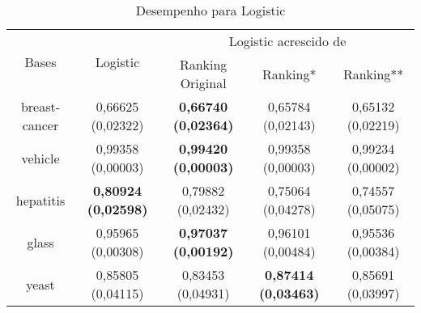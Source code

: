 \begin{table}[h]
    \begin{tabular}{ c c c c c }
        \hline

        \multirow{2}{*}{Bases} & \multirow{2}{*}{Logistic} & \multicolumn{3}{c}{Logistic acrescido de} \\ \cline{3-5}
        & & {\small Ranking Original} & {\small Ranking*} & {\small  Ranking**} \\
        
        \hline
        
        breast-cancer & {\small 0,66625 (0,02322)} & {\small \textbf{0,66740 (0,02364)}} & {\small 0,65784 (0,02143)} & {\small 0,65132 (0,02219)} \\
        vehicle & {\small 0,99358 (0,00003)} & {\small \textbf{0,99420 (0,00003)}} & {\small 0,99358 (0,00003)} & {\small 0,99234 (0,00002)} \\
        hepatitis & {\small \textbf{0,80924 (0,02598)}} & {\small 0,79882 (0,02432)} & {\small 0,75064 (0,04278)} & {\small 0,74557 (0,05075)} \\
        glass & {\small 0,95965 (0,00308)} & {\small \textbf{0,97037 (0,00192)}} & {\small 0,96101 (0,00484)} & {\small 0,95536 (0,00384)} \\
        yeast & 0{\small ,85805 (0,04115)} & {\small 0,83453 (0,04931)} & {\small \textbf{0,87414 (0,03463)}} & {\small 0,85691 (0,03997)} \\
    
        \hline
    \end{tabular}
    
    \caption{Desempenho para Logistic}
    \label{logistic_results_table}
\end{table}

